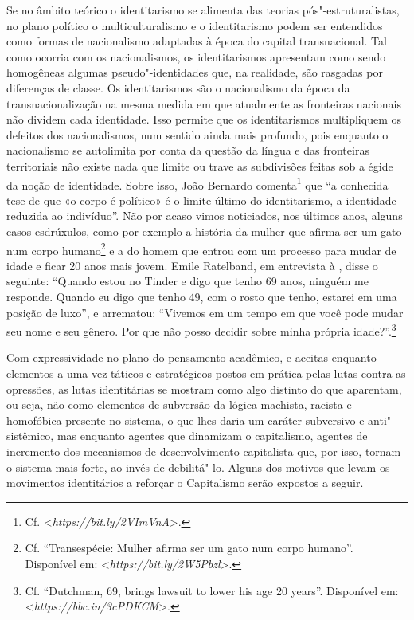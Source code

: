 Se no âmbito teórico o identitarismo se alimenta das teorias
pós"-estruturalistas, no plano político o multiculturalismo e o
identitarismo podem ser entendidos como formas de nacionalismo adaptadas
à época do capital transnacional. Tal como ocorria com os nacionalismos,
os identitarismos apresentam como sendo homogêneas algumas
pseudo"-identidades que, na realidade, são rasgadas por diferenças de
classe. Os identitarismos são o nacionalismo da época da
transnacionalização na mesma medida em que atualmente as fronteiras
nacionais não dividem cada identidade. Isso permite que os
identitarismos multipliquem os defeitos dos nacionalismos, num sentido
ainda mais profundo, pois enquanto o nacionalismo se autolimita por
conta da questão da língua e das fronteiras territoriais não existe nada
que limite ou trave as subdivisões feitas sob a égide da noção de
identidade. Sobre isso, João Bernardo comenta\footnote{Cf.
  \textless{}\emph{https://bit.ly/2VImVnA}\textgreater{}.} que
``a conhecida tese de que «o corpo é político» é o limite último do
identitarismo, a identidade reduzida ao indivíduo''. Não por acaso vimos
noticiados, nos últimos anos, alguns casos esdrúxulos, como por exemplo
a história da mulher que afirma ser um gato num corpo humano\footnote{Cf.
  ``Transespécie: Mulher afirma ser um gato num corpo humano''.
  Disponível em: \textless{}\emph{https://bit.ly/2W5Pbzl}\textgreater{}.} e a do homem que
entrou com um processo para mudar de idade e ficar 20 anos mais jovem.
Emile Ratelband, em entrevista à , disse o seguinte: ``Quando estou
no Tinder e digo que tenho 69 anos, ninguém me responde. Quando eu digo
que tenho 49, com o rosto que tenho, estarei em uma posição de luxo'', e
arrematou: ``Vivemos em um tempo em que você pode mudar seu nome e seu
gênero. Por que não posso decidir sobre minha própria
idade?''.\footnote{Cf. ``Dutchman, 69, brings lawsuit to lower his age
  20 years''. Disponível em: \textless{}\emph{https://bbc.in/3cPDKCM}\textgreater{}.}

Com expressividade no plano do pensamento acadêmico, e aceitas enquanto
elementos a uma vez táticos e estratégicos postos em prática pelas lutas
contra as opressões, as lutas identitárias se mostram como algo distinto
do que aparentam, ou seja, não como elementos de subversão da lógica
machista, racista e homofóbica presente no sistema, o que lhes daria um
caráter subversivo e anti"-sistêmico, mas enquanto agentes que dinamizam
o capitalismo, agentes de incremento dos mecanismos de desenvolvimento
capitalista que, por isso, tornam o sistema mais forte, ao invés de
debilitá"-lo. Alguns dos motivos que levam os movimentos identitários a
reforçar o Capitalismo serão expostos a seguir.

